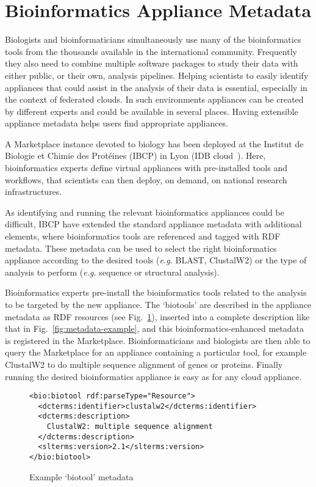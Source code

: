 \section{Bioinformatics Appliance Metadata}
\label{sec:bioinfo}

Biologists and bioinformaticians simultaneously use many of the
bioinformatics tools from the thousands available in the international
community. Frequently they also need to combine multiple software
packages to study their data with either public, or their own,
analysis pipelines. Helping scientists to easily identify appliances
that could assist in the analysis of their data is essential,
especially in the context of federated clouds. In such environments
appliances can be created by different experts and could be available
in several places.  Having extensible appliance metadata helps users
find appropriate appliances.

A Marketplace instance devoted to biology has been deployed at the
Institut de Biologie et Chimie des Prot\'eines (IBCP) in Lyon (IDB
cloud~\cite{idbcloud}). Here, bioinformatics experts define virtual
appliances with pre-installed tools and workflows, that scientists can
then deploy, on demand, on national research infrastructures.

As identifying and running the relevant bioinformatics appliances
could be difficult, IBCP have extended the standard appliance metadata
with additional elements, where bioinformatics tools are referenced
and tagged with RDF metadata. These metadata can be used to select the
right bioinformatics appliance according to the desired tools
(\textit{e.g.} BLAST, ClustalW2) or the type of analysis to perform
(\textit{e.g.} sequence or structural analysis).

Bioinformatics experts pre-install the bioinformatics tools related to
the analysis to be targeted by the new appliance. The `biotools' are
described in the appliance metadata as RDF resources (see
Fig.~\ref{fig:biotool-schema}), inserted into a complete description
like that in Fig.~\ref{fig:metadata-example}, and this
bioinformatics-enhanced metadata is registered in the
Marketplace\@. Bioinformaticians and biologists are then able to query
the Marketplace for an appliance containing a particular tool, for
example ClustalW2 to do multiple sequence alignment of genes or
proteins. Finally running the desired bioinformatics appliance is easy
as for any cloud appliance.

\begin{figure}
\tiny
 \begin{center}
    \begin{verbatim}
<bio:biotool rdf:parseType="Resource">
  <dcterms:identifier>clustalw2</dcterms:identifier>
  <dcterms:description>
    ClustalW2: multiple sequence alignment
  </dcterms:description>
  <slterms:version>2.1</slterms:version>
</bio:biotool>
    \end{verbatim}
  \end{center}
 \caption{Example `biotool' metadata}
 \label{fig:biotool-schema}
\end{figure}
